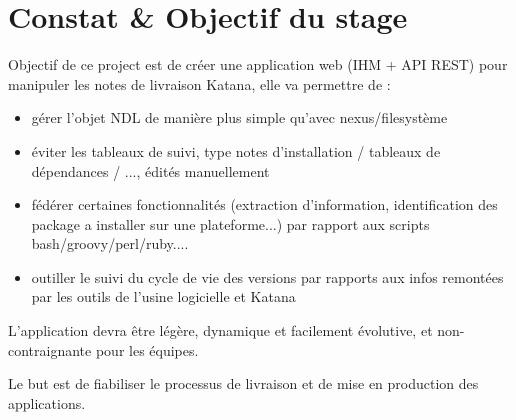 \section{Constat \& Objectif du stage}
Objectif de ce project est de créer une application web (IHM + API REST) pour manipuler les notes de livraison Katana, elle va permettre de :

\begin{itemize}
  \item gérer l'objet NDL de manière plus simple qu'avec nexus/filesystème
  \item éviter les tableaux de suivi, type notes d'installation / tableaux de dépendances / ..., édités manuellement
  \item fédérer certaines fonctionnalités (extraction d'information, identification des package a installer sur une plateforme...) par rapport aux scripts bash/groovy/perl/ruby....
  \item  outiller le suivi du cycle de vie des versions par rapports aux infos remontées par les outils de l'usine logicielle et Katana
\end{itemize}

L’application devra être légère, dynamique et facilement évolutive, et non-contraignante pour les équipes.

Le but est de fiabiliser le processus de livraison et de mise en production des applications.
\clearpage

